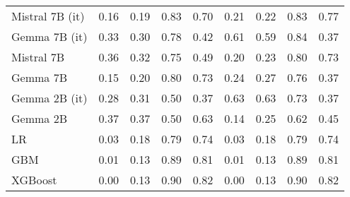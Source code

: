 \begin{tabular}{lllllllll}
Mistral 7B (it) & 0.16 & 0.19 & \cellcolor{cyan!5.3} 0.83 & 0.70 & 0.21 & \cellcolor{cyan!4.7} 0.22 & 0.83 & \cellcolor{cyan!9.2} 0.77 \\
Gemma 7B (it) & 0.33 & 0.30 & 0.78 & 0.42 & \cellcolor{orange!14.7} 0.61 & \cellcolor{orange!4.7} 0.59 & 0.84 & \cellcolor{orange!25.0} 0.37 \\
Mistral 7B & \cellcolor{orange!15.7} 0.36 & 0.32 & 0.75 & 0.49 & 0.20 & 0.23 & 0.80 & 0.73 \\
Gemma 7B & 0.15 & 0.20 & 0.80 & 0.73 & 0.24 & 0.27 & 0.76 & \cellcolor{orange!25.0} 0.37 \\
Gemma 2B (it) & 0.28 & 0.31 & \cellcolor{orange!25.0} 0.50 & \cellcolor{orange!25.0} 0.37 & \cellcolor{orange!25.0} 0.63 & \cellcolor{orange!25.0} 0.63 & 0.73 & \cellcolor{orange!25.0} 0.37 \\
Gemma 2B & \cellcolor{orange!25.0} 0.37 & \cellcolor{orange!25.0} 0.37 & \cellcolor{orange!25.0} 0.50 & 0.63 & \cellcolor{cyan!25.0} 0.14 & 0.25 & \cellcolor{orange!25.0} 0.62 & 0.45 \\
LR & 0.03 & 0.18 & 0.79 & 0.74 & 0.03 & 0.18 & 0.79 & 0.74 \\
GBM & 0.01 & 0.13 & 0.89 & 0.81 & 0.01 & 0.13 & 0.89 & 0.81 \\
XGBoost & 0.00 & 0.13 & 0.90 & 0.82 & 0.00 & 0.13 & 0.90 & 0.82 \\
\bottomrule
\end{tabular}

